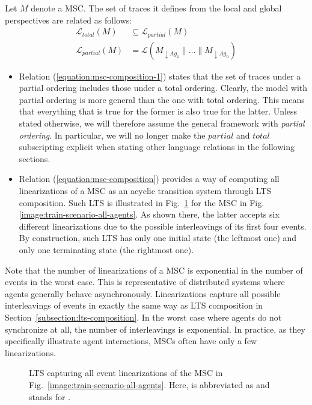 Let $M$ denote a MSC. The set of traces it defines from the local and global perspectives are related as follows:
\begin{align}
\mathcal{L}_{total}(M) & \subseteq \mathcal{L}_{partial}(M) 
\label{equation:msc-composition-1} \\
\mathcal{L}_{partial}(M) &= \mathcal{L}(M_{\downarrow Ag_1} \parallel \ldots \parallel M_{\downarrow Ag_n})
\label{equation:msc-composition}
\end{align}

\begin{itemize}
\item Relation (\ref{equation:msc-composition-1}) states that the set of traces under a partial ordering includes those under a total ordering. Clearly, the model with partial ordering is more general than the one with total ordering. This means that everything that is true for the former is also true for the latter. Unless stated otherwise, we will therefore assume the general framework with \emph{partial ordering}. In particular, we will no longer make the $partial$ and $total$ subscripting explicit when stating other language relations in the following sections.

\item Relation (\ref{equation:msc-composition}) provides a way of computing all linearizations of a MSC as an acyclic transition system through LTS composition. Such LTS is illustrated in Fig.~\ref{image:msc-linearizations} for the MSC in Fig.\ref{image:train-scenario-all-agents}. As shown there, the latter accepts six different linearizations due to the possible interleavings of its first four events. By construction, such LTS has only one initial state (the leftmost one) and only one terminating state (the rightmost one).
\end{itemize}

Note that the number of linearizations of a MSC is exponential in the number of events in the worst case. This is representative of distributed systems where agents generally behave asynchronously. Linearizations capture all possible interleavings of events in exactly the same way as LTS composition in Section~\ref{subsection:lts-composition}. In the worst case where agents do not synchronize at all, the number of interleavings is exponential. In practice, as they specifically illustrate agent interactions, MSCs often have only a few linearizations.

\begin{figure}\centering
{}
\caption[LTS capturing all event linearizations of a MSC]{LTS capturing all event linearizations of the MSC in Fig.~\ref{image:train-scenario-all-agents}. Here,  is abbreviated as  and  stands for . \label{image:msc-linearizations}}
\end{figure}

